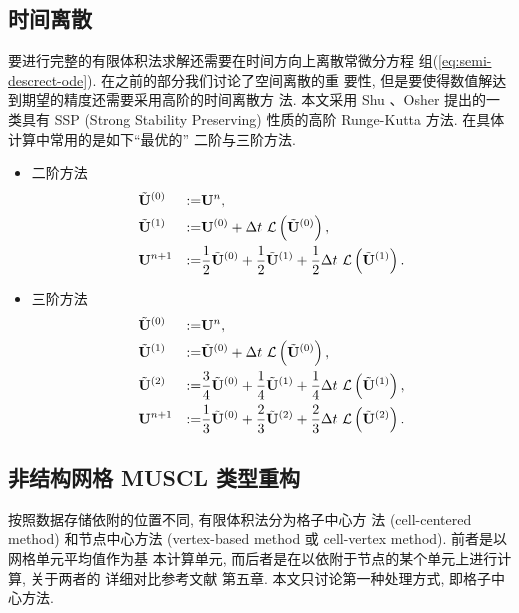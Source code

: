 \subsection{时间离散}
\label{sec:time-stepping-methods}

要进行完整的有限体积法求解还需要在时间方向上离散常微分方程
组(\ref{eq:semi-descrect-ode}). 在之前的部分我们讨论了空间离散的重
要性, 但是要使得数值解达到期望的精度还需要采用高阶的时间离散方
法. 本文采用 Shu 、Osher \cite{Shu1988} 提出的一类具有 SSP
(Strong Stability Preserving) 性质的高阶 Runge-Kutta 方法. 在具体
计算中常用的是如下``最优的'' 二阶与三阶方法.

\begin{itemize}
\item 二阶方法
  \begin{equation}
    \label{eq:second-order-rk}
    \begin{aligned}
      &\tilde{{\bf{U}}}^{(0)} & := &{\bf{U}}^{n},\\
      &\tilde{{\bf{U}}}^{(1)} & := &{\bf{U}}^{(0)} + \Delta t ~
      \mathcal{L} \left( \tilde{{\bf{U}}}^{(0)} \right),\\
      &{\bf{U}}^{n+1} & := &\frac{1}{2}\tilde{\bf{U}}^{(0)} +
      \frac{1}{2}\tilde{{\bf{U}}}^{(1)} + \frac{1}{2} \Delta t ~
      \mathcal{L} \left( \tilde{{\bf{U}}}^{(1)} \right).
    \end{aligned}
  \end{equation}
\item 三阶方法
  \begin{equation}
    \label{eq:3rd-rk}
    \begin{aligned}
      & \tilde{{\bf{U}}}^{(0)} & := & {\bf{U}}^{n},\\
      & \tilde{{\bf{U}}}^{(1)} & := & \tilde{{\bf{U}}}^{(0)} +
      \Delta t ~ \mathcal{L} \left( \tilde{{\bf{U}}}^{(0)}
      \right),\\
      & \tilde{{\bf{U}}}^{(2)} & := &
      \frac{3}{4}\tilde{{\bf{U}}}^{(0)} +
      \frac{1}{4}\tilde{{\bf{U}}}^{(1)} + \frac{1}{4} \Delta t ~
      \mathcal{L} \left( \tilde{{\bf{U}}}^{(1)} \right),\\
      & {\bf{U}}^{n+1} & := & \frac{1}{3} \tilde {{\bf{U}}}^{(0)}
      + \frac{2}{3} \tilde{{\bf{U}}}^{(2)} + \frac{2}{3} \Delta t
      ~ \mathcal{L} \left( \tilde{{\bf{U}}}^{(2)} \right).
    \end{aligned}
  \end{equation}
\end{itemize}

\subsection{非结构网格 MUSCL 类型重构}
\label{sec:MUSCL-on-unstru}
按照数据存储依附的位置不同, 有限体积法分为格子中心方
法 (cell-centered method) 和节点中心方法 (vertex-based method 或
cell-vertex method). 前者是以网格单元平均值作为基
本计算单元, 而后者是在以依附于节点的某个单元上进行计算, 关于两者的
详细对比参考文献 \cite{Blazek2001} 第五章. 本文只讨论第一种处理方式,
即格子中心方法.

